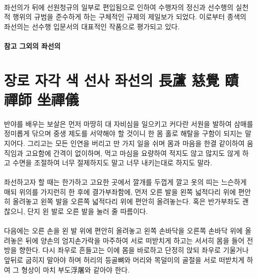 \documentclass[12pt, a4paper, oneside]{book}
\let\stdsection\section
\renewcommand\section{\newpage\stdsection}
\begin{document}
\paragraph{}
좌선의가 뒤에 선원청규의 일부로 편입됨으로 인하여 수행자의 정신과 선수행의 실천적 행위의 규범을 준수하게 하는 구체적인 규제의 제일보가 되었다.
이로부터 종색의 좌선의는 선수행 입문서의 대표적인 작품으로 평가되고 있다.


\paragraph{}



\paragraph{참고 그외의 좌선의 }



%
	\section{장로 자각 색 선사 좌선의 長蘆 慈覺 賾 禪師 坐禪儀 }
          

\paragraph{}
반야를 배우는 보살은 먼저 마땅히 대 자비심을 일으키고 
커다란 서원을 발하여 삼매를 정미롭게 닦으며 
중생 제도를 서약해야 할 것이니 
한 몸 홀로 해탈을 구함이 되지는 말지어다. 
그리고는 모든 인연을 버리고 만 가지 일을 쉬며 
몸과 마음을 한결 같이하여 움직임과 고요함에 간격이 없이하며, 
먹고 마심을 요량하여 적지도 않고 많지도 않게 하고 
수면을 조절하여 너무 절제하지도 말고 너무 내키는대로 하지도 말라.

\paragraph{}
좌선하고자 할 때는 
한가하고 고요한 곳에서 깔개를 두껍게 깔고 
옷의 띠는 느슨하게 매되 위의를 가지런히 한 후에 결가부좌함에, 
먼저 오른 발을 왼쪽 넓적다리 위에 편안히 올려놓고 
왼쪽 발을 오른쪽 넓적다리 위에 편안히 올려놓는다. 
혹은 반가부좌도 괜찮으니, 단지 왼 발로 오른 발을 눌러 줄 따름이다. 

\paragraph{}
다음에는 오른 손을 왼 발 위에 편안히 올려놓고 
왼쪽 손바닥을 오른쪽 손바닥 위에 올려놓은 뒤에 
양손의 엄지손가락을 마주하여 서로 떠받치게 하고는 
서서히 몸을 들어 전방을 향한다. 
다시 좌우로 흔들고는 이에 몸을 바로하고 단정히 앉되
좌우로 기울거나 앞뒤로 굽히지 말아야 하며 
허리의 등골뼈와 머리와 목덜미의 골절을 서로 떠받치게 하여 
그 형상이 마치 부도浮屠와 같아야 한다. 
\end{document}
